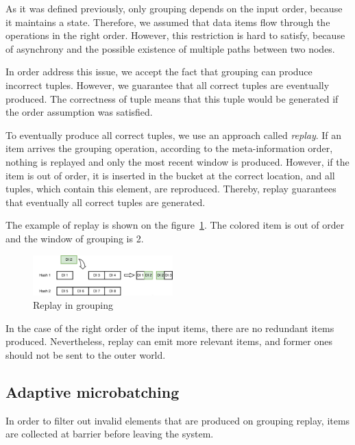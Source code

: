 \label {fs-collision}

As it was defined previously, only grouping depends on the input order, because it maintains a state. Therefore, we assumed that data items flow through the operations in the right order. However, this restriction is hard to satisfy, because of asynchrony and the possible existence of multiple paths between two nodes.

In order address this issue, we accept the fact that grouping can produce incorrect tuples. However, we guarantee that all correct tuples are eventually produced. The correctness of tuple means that this tuple would be generated if the order assumption was satisfied. 

To eventually produce all correct tuples, we use an approach called {\it replay}. If an item arrives the grouping operation, according to the meta-information order, nothing is replayed and only the most recent window is produced. However, if the item is out of order, it is inserted in the bucket at the correct location, and all tuples, which contain this element, are reproduced. Thereby, replay guarantees that eventually all correct tuples are generated.

The example of replay is shown on the figure~\ref{grouping-replaying-figure}. The colored item is out of order and the window of grouping is 2.

\begin{figure}[htbp]
  \centering
  \includegraphics[width=0.48\textwidth]{pics/grouping-replaying}
  \caption{Replay in grouping}
  \label {grouping-replaying-figure}
\end{figure}

In the case of the right order of the input items, there are no redundant items produced. Nevertheless, replay can emit more relevant items, and former ones should not be sent to the outer world.

\subsection{Adaptive microbatching}
In order to filter out invalid elements that are produced on grouping replay, items are collected at barrier before leaving the system.

